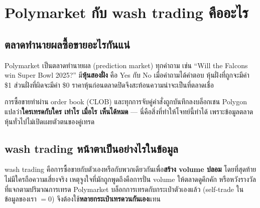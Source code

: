 \documentclass[11pt,a4paper]{article}
\begin{document}
\section{Polymarket กับ wash trading คืออะไร}

\subsection{ตลาดทำนายผลซื้อขายอะไรกันแน่}

Polymarket เป็นตลาดทำนายผล (prediction market) ทุกคำถาม เช่น
``Will the Falcons win Super Bowl 2025?'' มี\textbf{หุ้นสองฝั่ง} คือ Yes กับ No
เมื่อคำถามได้คำตอบ หุ้นฝั่งที่ถูกจะมีค่า \$1 ส่วนฝั่งที่ผิดจะมีค่า \$0
ราคาหุ้นก่อนตลาดปิดจึงสะท้อนความน่าจะเป็นที่ตลาดเชื่อ

การซื้อขายทำผ่าน order book (CLOB) และทุกการจับคู่คำสั่งถูกบันทึกลงบล็อกเชน Polygon
แปลว่า\textbf{ใครเทรดกับใคร เท่าไร เมื่อไร เห็นได้หมด} --- นี่คือสิ่งที่ทำให้โจทย์นี้ทำได้
เพราะข้อมูลตลาดหุ้นทั่วไปไม่เปิดเผยตัวตนของคู่เทรด

\subsection{wash trading หน้าตาเป็นอย่างไรในข้อมูล}

wash trading คือการซื้อขายกับตัวเองหรือกับพวกเดียวกันเพื่อ\textbf{สร้าง volume ปลอม}
โดยที่สุดท้ายไม่มีใครถือความเสี่ยงจริง เหตุจูงใจที่มักถูกพูดถึงคือการปั่น volume
ให้ตลาดดูคึกคัก หรือหวังรางวัลที่แจกตามปริมาณการเทรด
Polymarket บล็อกการเทรดกับกระเป๋าตัวเองแล้ว (self-trade ในข้อมูลของเรา $=0$)
จึงต้องใช้\textbf{หลายกระเป๋าเทรดวนกันเอง}แทน
\end{document}

